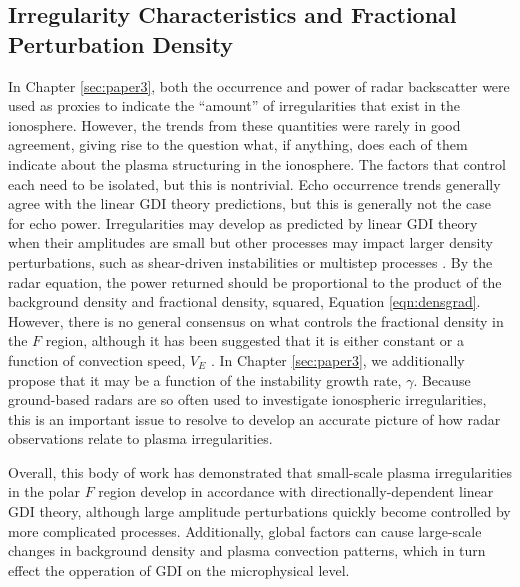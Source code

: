 \subsection{Irregularity Characteristics and Fractional Perturbation Density}
\label{sec:fw_fracdens}
In Chapter \ref{sec:paper3}, both the occurrence and power of radar backscatter were used as proxies to indicate the ``amount'' of irregularities that exist in the ionosphere.  However, the trends from these quantities were rarely in good agreement, giving rise to the question what, if anything, does each of them indicate about the plasma structuring in the ionosphere.  The factors that control each need to be isolated, but this is nontrivial.  Echo occurrence trends generally agree with the linear GDI theory predictions, but this is generally not the case for echo power.  Irregularities may develop as predicted by linear GDI theory when their amplitudes are small but other processes may impact larger density perturbations, such as shear-driven instabilities \citep{Gondarenko2006} or multistep processes \citep{Carlson2012}.  By the radar equation, the power returned should be proportional to the product of the background density and fractional density, squared, Equation \ref{eqn:densgrad}.  However, there is no general consensus on what controls the fractional density in the \(F\) region, although it has been suggested that it is either constant or a function of convection speed, \(V_E\) \citep{Kustov1988,Haldoupis1990,Makarevich2014b}.  In Chapter \ref{sec:paper3}, we additionally propose that it may be a function of the instability growth rate, \(\gamma\).  Because ground-based radars are so often used to investigate ionospheric irregularities, this is an important issue to resolve to develop an accurate picture of how radar observations relate to plasma irregularities.

Overall, this body of work has demonstrated that small-scale plasma irregularities in the polar \(F\) region develop in accordance with directionally-dependent linear GDI theory, although large amplitude perturbations quickly become controlled by more complicated processes.  Additionally, global factors can cause large-scale changes in background density and plasma convection patterns, which in turn effect the opperation of GDI on the microphysical level.

